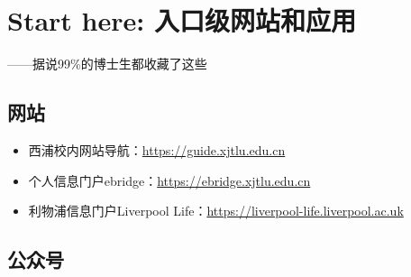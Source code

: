 \chapter{Start here: 入口级网站和应用}
\label{necessary_resources}

\begin{flushright}
    ——据说99\%的博士生都收藏了这些
\end{flushright}    

\section{网站}
\begin{itemize}
    \item 西浦校内网站导航：\url{https://guide.xjtlu.edu.cn}
    \item 个人信息门户ebridge：\url{https://ebridge.xjtlu.edu.cn}
    \item 利物浦信息门户Liverpool Life：\url{https://liverpool-life.liverpool.ac.uk}
\end{itemize}

\section{公众号}

